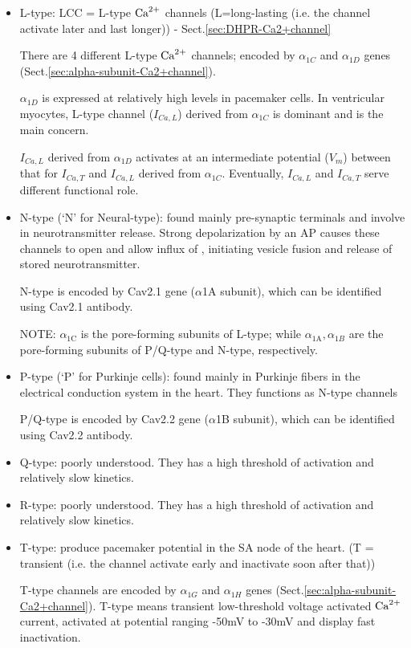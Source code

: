 \begin{itemize}

  \item L-type: LCC = L-type ${\text{Ca}^{2+}}$ channels  (L=long-lasting (i.e. the channel
  activate later and last longer)) - Sect.\ref{sec:DHPR-Ca2+channel}

There are 4 different L-type ${\text{Ca}^{2+}}$ channels; encoded by $\alpha_{1C}$ and
$\alpha_{1D}$ genes (Sect.\ref{sec:alpha-subunit-Ca2+channel}).

$\alpha_{1D}$ is expressed at relatively high levels in pacemaker cells.
In ventricular myocytes, L-type  channel ($I_{Ca,L}$) derived from
$\alpha_{1C}$ is dominant and is the main concern.

$I_{Ca,L}$ derived from $\alpha_{1D}$ activates at an intermediate potential
($V_m$) between that for $I_{Ca,T}$ and $I_{Ca,L}$ derived from $\alpha_{1C}$.
Eventually, $I_{Ca,L}$ and $I_{Ca,T}$ serve different functional role.


  \item N-type (`N' for Neural-type): found mainly pre-synaptic terminals and
  involve in neurotransmitter release. Strong depolarization by an AP causes
  these channels to open and allow influx of , initiating vesicle
  fusion and release of stored neurotransmitter.

N-type is encoded by Cav2.1 gene ($\alpha$1A subunit), which can be identified
using Cav2.1 antibody.

\begin{mdframed}
NOTE: $\alpha_\text{1C}$ is the pore-forming subunits of L-type; while
$\alpha_\text{1A},\alpha_{1B}$ are the pore-forming subunits of P/Q-type and
N-type, respectively.
\end{mdframed}

  \item P-type (`P' for Purkinje cells): found mainly in Purkinje fibers in the
electrical conduction system in the heart. They functions as N-type channels 

P/Q-type is encoded by Cav2.2 gene ($\alpha$1B subunit), which can be identified
using Cav2.2 antibody.
 
  \item Q-type: poorly understood. They has a high threshold of
  activation and relatively slow kinetics. 

  \item R-type: poorly understood. They has a high threshold of
  activation and relatively slow kinetics. 

  \item T-type: produce pacemaker potential in the SA node of the heart.
(T = transient (i.e. the channel activate early and inactivate soon after
that))

T-type channels are encoded by $\alpha_{1G}$ and $\alpha_{1H}$ genes
(Sect.\ref{sec:alpha-subunit-Ca2+channel}).
T-type means transient low-threshold voltage activated ${\text{Ca}^{2+}}$ current, activated
at potential ranging -50mV to -30mV and display fast inactivation.

\end{itemize}

